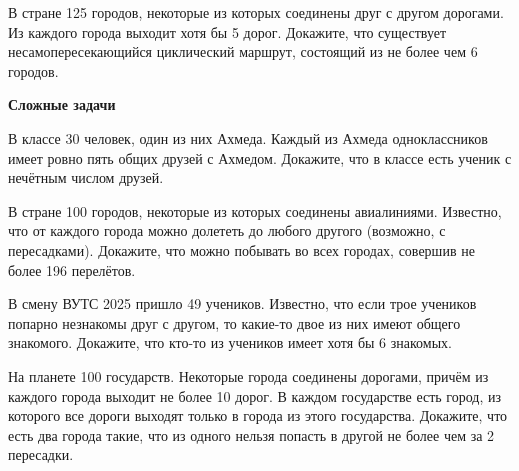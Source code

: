 В стране 125   городов, некоторые из которых соединены друг с другом дорогами. Из каждого города выходит хотя бы 5   дорог. Докажите, что существует несамопересекающийся циклический маршрут, состоящий из не более чем 6   городов.


\newpage

\hspace{3mm}


\centerline{\bf \large Сложные задачи}

В классе 30 человек, один из них Ахмеда. Каждый из Ахмеда одноклассников имеет ровно пять общих друзей с Ахмедом. Докажите, что в классе есть ученик с нечётным числом друзей.

В стране 100 городов, некоторые из которых соединены авиалиниями. Известно, что от каждого города можно долететь до любого другого (возможно, с пересадками). Докажите, что можно побывать во всех городах, совершив не более 196 перелётов.

В смену ВУТС 2025 пришло 49 учеников. Известно, что если трое учеников попарно незнакомы друг с другом, то какие-то двое из них имеют общего знакомого. Докажите, что кто-то из учеников имеет хотя бы 6 знакомых.

На планете 100 государств. Некоторые города соединены дорогами, причём из каждого города выходит не более 10 дорог. В каждом государстве есть город, из которого все дороги выходят только в города из этого государства. Докажите, что есть два города такие, что из одного нельзя попасть в другой не более чем за 2 пересадки.
